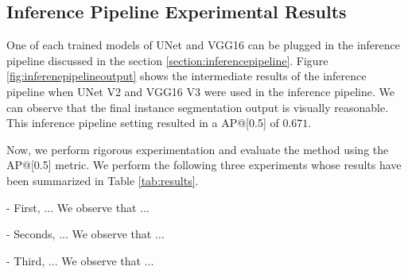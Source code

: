 \documentclass[10pt,twocolumn,letterpaper]{article}
\begin{document}

\subsection{Inference Pipeline Experimental Results} \label{section:experiments}
One of each trained models of UNet and VGG16 can be plugged in the inference pipeline discussed in the section \ref{section:inferencepipeline}. Figure \ref{fig:inferenepipelineoutput} shows the intermediate results of the inference pipeline when UNet V2 and VGG16 V3 were used in the inference pipeline. We can observe that the final instance segmentation output is visually reasonable. This inference pipeline setting resulted in a AP@[0.5] of $0.671$.

Now, we perform rigorous experimentation and evaluate the method using the AP@[0.5] metric. We perform the following three experiments whose results have been summarized in Table \ref{tab:results}.

- First, ... We observe that ...

- Seconds, ... We observe that ...

- Third, ... We observe that ...
\end{document}
